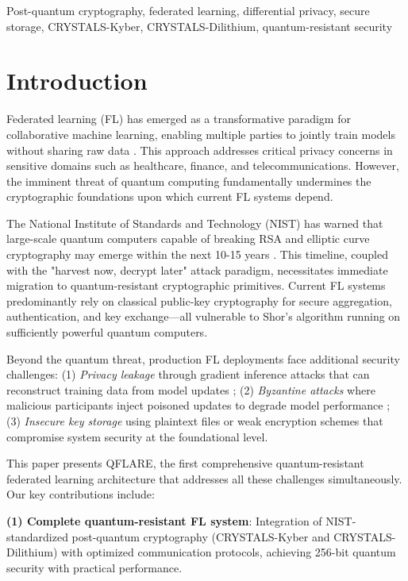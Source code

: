 \documentclass[conference]{IEEEtran}
\begin{document}
\begin{IEEEkeywords}
Post-quantum cryptography, federated learning, differential privacy, secure storage, CRYSTALS-Kyber, CRYSTALS-Dilithium, quantum-resistant security
\end{IEEEkeywords}

\section{Introduction}

Federated learning (FL) has emerged as a transformative paradigm for collaborative machine learning, enabling multiple parties to jointly train models without sharing raw data \cite{mcmahan2017communication}. This approach addresses critical privacy concerns in sensitive domains such as healthcare, finance, and telecommunications. However, the imminent threat of quantum computing fundamentally undermines the cryptographic foundations upon which current FL systems depend.

The National Institute of Standards and Technology (NIST) has warned that large-scale quantum computers capable of breaking RSA and elliptic curve cryptography may emerge within the next 10-15 years \cite{nist2022pqc}. This timeline, coupled with the "harvest now, decrypt later" attack paradigm, necessitates immediate migration to quantum-resistant cryptographic primitives. Current FL systems predominantly rely on classical public-key cryptography for secure aggregation, authentication, and key exchange—all vulnerable to Shor's algorithm running on sufficiently powerful quantum computers.

Beyond the quantum threat, production FL deployments face additional security challenges: (1) \textit{Privacy leakage} through gradient inference attacks that can reconstruct training data from model updates \cite{zhu2019deep}; (2) \textit{Byzantine attacks} where malicious participants inject poisoned updates to degrade model performance \cite{blanchard2017machine}; (3) \textit{Insecure key storage} using plaintext files or weak encryption schemes that compromise system security at the foundational level.

This paper presents QFLARE, the first comprehensive quantum-resistant federated learning architecture that addresses all these challenges simultaneously. Our key contributions include:

\textbf{(1) Complete quantum-resistant FL system}: Integration of NIST-standardized post-quantum cryptography (CRYSTALS-Kyber and CRYSTALS-Dilithium) with optimized communication protocols, achieving 256-bit quantum security with practical performance.
\end{document}
